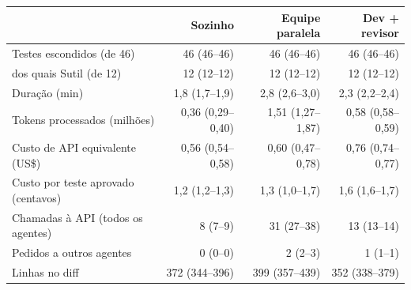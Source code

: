 \begin{tabular}{lrrr}
\toprule
 & Sozinho & Equipe paralela & Dev + revisor \\
\midrule
Testes escondidos (de 46) & 46 (46--46) & 46 (46--46) & 46 (46--46) \\
\quad dos quais Sutil (de 12) & 12 (12--12) & 12 (12--12) & 12 (12--12) \\
Duração (min) & 1{,}8 (1{,}7--1{,}9) & 2{,}8 (2{,}6--3{,}0) & 2{,}3 (2{,}2--2{,}4) \\
Tokens processados (milhões) & 0{,}36 (0{,}29--0{,}40) & 1{,}51 (1{,}27--1{,}87) & 0{,}58 (0{,}58--0{,}59) \\
Custo de API equivalente (US\$) & 0{,}56 (0{,}54--0{,}58) & 0{,}60 (0{,}47--0{,}78) & 0{,}76 (0{,}74--0{,}77) \\
Custo por teste aprovado (centavos) & 1{,}2 (1{,}2--1{,}3) & 1{,}3 (1{,}0--1{,}7) & 1{,}6 (1{,}6--1{,}7) \\
Chamadas à API (todos os agentes) & 8 (7--9) & 31 (27--38) & 13 (13--14) \\
Pedidos a outros agentes & 0 (0--0) & 2 (2--3) & 1 (1--1) \\
Linhas no diff & 372 (344--396) & 399 (357--439) & 352 (338--379) \\
\bottomrule
\end{tabular}
